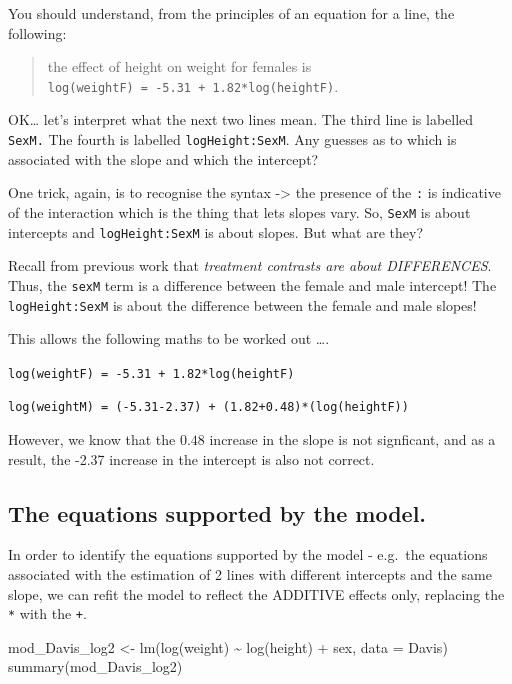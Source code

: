 \documentclass[
]{book}
\newenvironment{Shaded}{\begin{snugshade}}{\end{snugshade}}
\newcommand{\AttributeTok}[1]{\textcolor[rgb]{0.77,0.63,0.00}{#1}}
\newcommand{\FunctionTok}[1]{\textcolor[rgb]{0.00,0.00,0.00}{#1}}
\newcommand{\NormalTok}[1]{#1}
\newcommand{\OtherTok}[1]{\textcolor[rgb]{0.56,0.35,0.01}{#1}}
\newcommand{\SpecialCharTok}[1]{\textcolor[rgb]{0.00,0.00,0.00}{#1}}
\begin{document}
You should understand, from the principles of an equation for a line, the following:

\begin{quote}
the effect of height on weight for females is \texttt{log(weightF)\ =\ -5.31\ +\ 1.82*log(heightF)}.
\end{quote}

OK\ldots{} let's interpret what the next two lines mean. The third line is labelled \texttt{SexM.} The fourth is labelled \texttt{logHeight:SexM}. Any guesses as to which is associated with the slope and which the intercept?

One trick, again, is to recognise the syntax -\textgreater{} the presence of the \texttt{:} is indicative of the interaction which is the thing that lets slopes vary. So, \texttt{SexM} is about intercepts and \texttt{logHeight:SexM} is about slopes. But what are they?

Recall from previous work that \emph{treatment contrasts are about DIFFERENCES}. Thus, the \texttt{sexM} term is a difference between the female and male intercept! The \texttt{logHeight:SexM} is about the difference between the female and male slopes!

This allows the following maths to be worked out \ldots.

\texttt{log(weightF)\ =\ -5.31\ +\ 1.82*log(heightF)}

\texttt{log(weightM)\ =\ (-5.31-2.37)\ +\ (1.82+0.48)*(log(heightF))}

However, we know that the \(0.48\) increase in the slope is not signficant, and as a result, the -2.37 increase in the intercept is also not correct.

\hypertarget{the-equations-supported-by-the-model.}{%
\subsection{The equations supported by the model.}\label{the-equations-supported-by-the-model.}}

In order to identify the equations supported by the model - e.g.~the equations associated with the estimation of 2 lines with different intercepts and the same slope, we can refit the model to reflect the ADDITIVE effects only, replacing the \texttt{*} with the \texttt{+}.

\begin{Shaded}
\begin{Highlighting}[]
\NormalTok{mod\_Davis\_log2 }\OtherTok{\textless{}{-}} \FunctionTok{lm}\NormalTok{(}\FunctionTok{log}\NormalTok{(weight) }\SpecialCharTok{\textasciitilde{}} \FunctionTok{log}\NormalTok{(height) }\SpecialCharTok{+}\NormalTok{ sex, }\AttributeTok{data =}\NormalTok{ Davis)}
\FunctionTok{summary}\NormalTok{(mod\_Davis\_log2)}
\end{Highlighting}
\end{Shaded}
\end{document}
